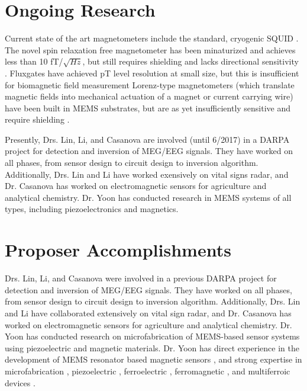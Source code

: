 \section{Ongoing Research}
Current state of the art magnetometers include the standard, cryogenic SQUID \cite{lenz2006magnetic}. The novel spin relaxation free magnetometer has been minaturized and achieves less than 10 fT/$\sqrt{Hz}$, but still requires shielding and lacks directional sensitivity \cite{shah2013compact}. Fluxgates have achieved pT level resolution at small size, but this is insufficient for biomagnetic field measurement \cite{sasada2002orthogonal,uchiyama2014highly,sasada2014fundamental}  Lorenz-type magnetometers (which translate magnetic fields into mechanical actuation of a magnet or current carrying wire) have been built in MEMS substrates, but are as yet insufficiently sensitive and require shielding \cite{sinha201627,kyynarainen20083d,kumar2015ultra,thompson2009parametrically}.

Presently, Drs. Lin, Li, and Casanova are involved (until 6/2017) in a DARPA project for detection and inversion of MEG/EEG signals. They have worked on all phases, from sensor design to circuit design to inversion algorithm. Additionally, Drs. Lin and Li have worked exensively on vital signs radar, and Dr. Casanova has worked on electromagnetic sensors for agriculture and analytical chemistry. Dr. Yoon has conducted research in MEMS systems of all types, including piezoelectronics and magnetics.

\section{Proposer Accomplishments}
Drs. Lin, Li, and Casanova were involved in a previous DARPA project for detection and inversion of MEG/EEG signals. They have worked on all phases, from sensor design to circuit design to inversion algorithm. Additionally, Drs. Lin and Li have collaborated extensively on vital sign radar, and Dr. Casanova has worked on electromagnetic sensors for agriculture and analytical chemistry. Dr. Yoon has conducted research on microfabrication of MEMS-based sensor systems using piezoelectric and magnetic materials. Dr. Yoon has direct experience in the development of MEMS resonator based magnetic sensors \cite{choi2006magnetically, choi2006magnetically2, choi2011nonlinear}, and strong expertise in microfabrication \cite{yoon2006multidirectional}, piezoelectric \cite{wulateral}, ferroelectric \cite{kim2014microwave,yoon2005low,yoon2003reduced}, ferromagnetic \cite{rahimi2016study,rahimi2015cylindrical,yoon2013multi}, and multiferroic devices \cite{yoon2013multi,kim2014room}.


